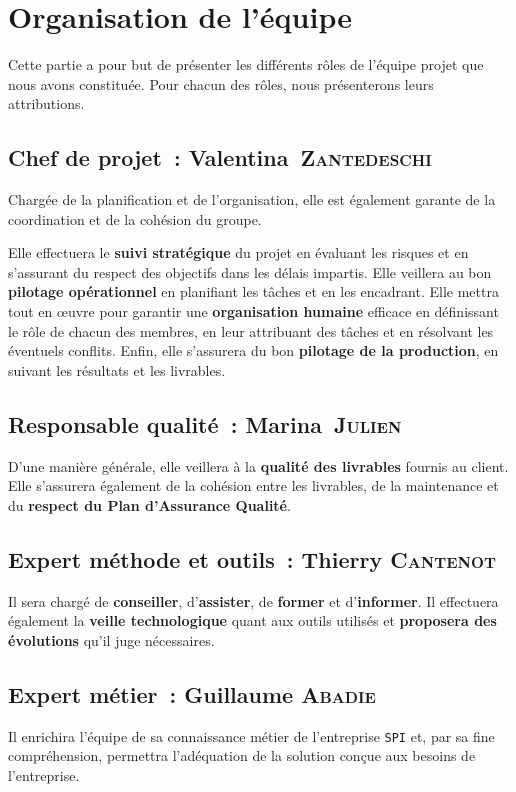 \chapter{Organisation de l'équipe}
Cette partie a pour but de présenter les différents rôles de l'équipe projet que nous avons constituée. Pour chacun des rôles, nous présenterons leurs attributions.

\section{Chef de projet~: Valentina~\textsc{Zantedeschi}}
Chargée de la planification et de l'organisation, elle est également garante de la coordination et de la cohésion du groupe.

Elle effectuera le \textbf{suivi stratégique} du projet en évaluant les risques et en s'assurant du respect des objectifs dans les délais impartis. Elle veillera au bon \textbf{pilotage opérationnel} en planifiant les tâches et en les encadrant. Elle mettra tout en œuvre pour garantir une \textbf{organisation humaine} efficace en définissant le rôle de chacun des membres, en leur attribuant des tâches et en résolvant les éventuels conflits. Enfin, elle s'assurera du bon \textbf{pilotage de la production}, en suivant les résultats et les livrables.

\section{Responsable qualité~: Marina~\textsc{Julien}}
D'une manière générale, elle veillera à la \textbf{qualité des livrables} fournis au client. Elle s'assurera également de la cohésion entre les livrables, de la maintenance et du \textbf{respect du Plan d'Assurance Qualité}.

\section{Expert méthode et outils~: Thierry \textsc{Cantenot}}
Il sera chargé de \textbf{conseiller}, d'\textbf{assister}, de \textbf{former} et d'\textbf{informer}. Il effectuera également la \textbf{veille technologique} quant aux outils utilisés et \textbf{proposera des évolutions} qu'il juge nécessaires.

\section{Expert métier~: Guillaume \textsc{Abadie}}
Il enrichira l'équipe de sa connaissance métier de l'entreprise \texttt{SPI} et, par sa fine compréhension, permettra l'adéquation de la solution conçue aux besoins de l'entreprise.


